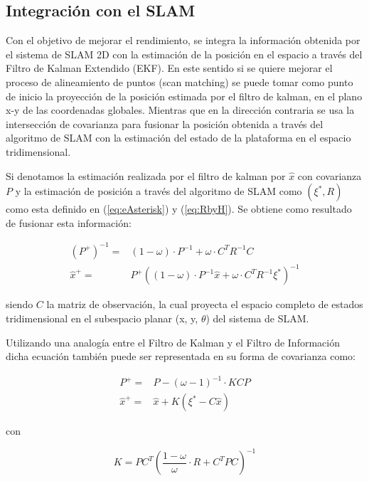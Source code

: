 \documentclass[10pt,a4paper]{article}
\begin{document}
\subsection{Integración con el SLAM}

Con el objetivo de mejorar el rendimiento, se integra la información obtenida por el sistema de SLAM 2D con la estimación de la posición en el espacio a través del Filtro de Kalman Extendido (EKF). En este sentido si se quiere mejorar el proceso de alineamiento de puntos (scan matching) se puede tomar como punto de inicio la proyección de la posición estimada por el filtro de kalman, en el plano x-y de las coordenadas globales. Mientras que en la dirección contraria se usa la intersección de covarianza para fusionar la posición obtenida a través del algoritmo de SLAM con la estimación del estado de la plataforma en el espacio tridimensional.

Si denotamos la estimación realizada por el filtro de kalman por $ \hat{x} $ con covarianza $ P $ y la estimación de posición a través del algoritmo de SLAM como $ (\xi^{*}, R) $ como esta definido en (\ref{eq:eAsterisk}) y (\ref{eq:RbyH}). Se obtiene como resultado de fusionar esta información:

\begin{align}
		(P^{+})^{-1} = 
			& (1-\omega) \cdot P^{-1} + \omega \cdot C^{T}R^{-1}C
		\\
		\hat{x}^{+} =
			& P^{+}\left( (1-\omega) \cdot P^{-1} \hat{x} + 
				\omega \cdot C^{T}R^{-1} \xi^{*} \right)^{-1}
\end{align}

siendo $ C $ la matriz de observación, la cual proyecta el espacio completo de estados tridimensional en el subespacio planar (x, y, $ \theta $) del sistema de SLAM.

Utilizando una analogía entre el Filtro de Kalman y el Filtro de Información dicha ecuación también puede ser representada en su forma de covarianza como: 

\begin{align}
	P^{+} =
		& P - (\omega - 1)^{-1} \cdot KCP
	\\
	\hat{x}^{+} =
		& \hat{x} + K ( \xi^{*} - C \hat{x} )
\end{align}

con

\begin{equation}
	K = P C^{T} \left(
		\frac{1 - \omega}{\omega} \cdot R + C^{T} P C \right)^{-1}
\end{equation}
\end{document}
